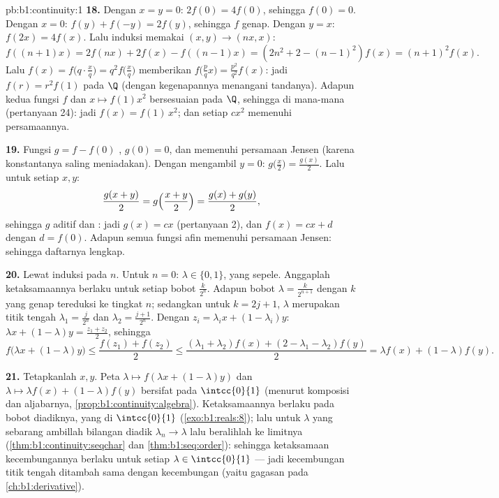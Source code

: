 \begin{solution}{pb:b1:continuity:1}
\textbf{18.} Dengan $x = y = 0$: $2f(0) = 4f(0)$, sehingga $f(0) = 0$. Dengan $x =
0$: $f(y) + f(-y) = 2f(y)$, sehingga $f$ genap. Dengan $y = x$: $f(2x) =
4f(x)$. Lalu induksi memakai $(x, y) \to (nx, x)$:
\[
f((n{+}1)x) = 2f(nx) + 2f(x) - f((n{-}1)x)
= (2n^2 + 2 - (n-1)^2) f(x) = (n+1)^2 f(x) .
\]
Lalu $f(x) = f\bigl(q\cdot\frac xq\bigr) = q^2 f\bigl(\frac
xq\bigr)$ memberikan $f\bigl(\frac pq x\bigr) = \frac{p^2}{q^2}f(x)$:
jadi $f(r) = r^2 f(1)$ pada $\Q$ (dengan kegenapannya menangani tandanya). Adapun kedua
fungsi  $f$ dan $x \mapsto f(1)x^2$ bersesuaian pada
  $\Q$, sehingga di mana-mana (pertanyaan 24): jadi $f(x) =
f(1)\,x^2$; dan setiap $cx^2$ memenuhi persamaannya.

\textbf{19.} Fungsi $g = f - f(0)$ , $g(0) = 0$, dan
memenuhi persamaan Jensen (karena konstantanya saling meniadakan). Dengan mengambil $y =
0$: $g\bigl(\frac x2\bigr) = \frac{g(x)}{2}$. Lalu untuk setiap $x,
y$:
\[
\frac{g(x + y)}{2} = g\Bigl(\frac{x+y}{2}\Bigr)
= \frac{g(x) + g(y)}{2} ,
\]
sehingga $g$ aditif dan : jadi $g(x) = cx$ (pertanyaan 2), dan
$f(x) = cx + d$ dengan $d = f(0)$. Adapun semua fungsi afin memenuhi
persamaan Jensen: sehingga daftarnya lengkap.

\textbf{20.} Lewat induksi pada $n$. Untuk $n = 0$: $\lambda \in \{0,
1\}$, yang sepele. Anggaplah ketaksamaannya berlaku untuk setiap bobot
$\frac{k}{2^n}$. Adapun bobot $\lambda = \frac{k}{2^{n+1}}$ dengan $k$ yang
genap tereduksi ke tingkat $n$; sedangkan untuk $k = 2j + 1$, $\lambda$ merupakan
titik tengah $\lambda_1 = \frac{j}{2^n}$ dan $\lambda_2 =
\frac{j+1}{2^n}$. Dengan $z_i = \lambda_i x + (1 - \lambda_i)y$:
$\lambda x + (1-\lambda)y = \frac{z_1 + z_2}{2}$, sehingga
\[
f\bigl(\lambda x + (1{-}\lambda)y\bigr)
\leq \frac{f(z_1) + f(z_2)}{2}
\leq \frac{(\lambda_1 + \lambda_2)f(x) + (2 - \lambda_1 -
\lambda_2)f(y)}{2}
= \lambda f(x) + (1 - \lambda)f(y) .
\]

\textbf{21.} Tetapkanlah $x, y$. Peta $\lambda \mapsto f(\lambda x +
(1 - \lambda)y)$ dan $\lambda \mapsto \lambda f(x) + (1 -
\lambda)f(y)$ bersifat  pada $\intcc{0}{1}$ (menurut komposisi dan
aljabarnya, \cref{prop:b1:continuity:algebra}). Ketaksamaannya
berlaku pada bobot diadiknya, yang  di $\intcc{0}{1}$
(\cref{exo:b1:reals:8}); lalu untuk $\lambda$ yang sebarang ambillah bilangan diadik
$\lambda_n \to \lambda$ lalu beralihlah ke limitnya
(\cref{thm:b1:continuity:seqchar} dan \cref{thm:b1:seq:order}):
sehingga ketaksamaan kecembungannya berlaku untuk setiap $\lambda \in
\intcc{0}{1}$ --- jadi kecembungan titik tengah ditambah  sama dengan
kecembungan (yaitu gagasan pada \cref{ch:b1:derivative}).


\end{solution}
